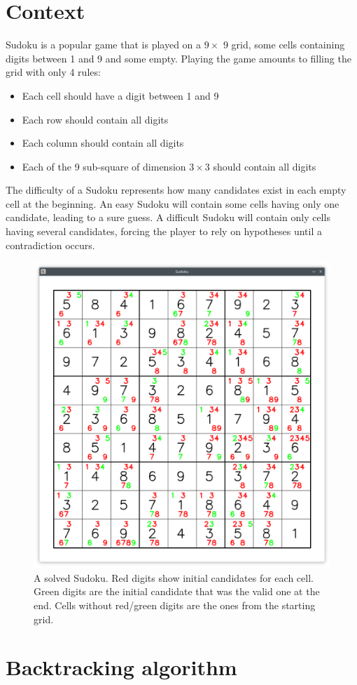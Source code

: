 \documentclass{ecnreport}
\begin{document}

\section{Context}

Sudoku is a popular game that is played on a $9\times$ 9 grid, some cells containing digits between 1 and 9 and some empty.
Playing the game amounts to filling the grid with only 4 rules:
\begin{itemize}
 \item Each cell should have a digit between 1 and 9
 \item Each row should contain all digits
 \item Each column should contain all digits
 \item Each of the 9 sub-square of dimension $3\times 3$ should contain all digits
\end{itemize}

The difficulty of a Sudoku represents how many candidates exist in each empty cell at the beginning. An easy Sudoku will contain some cells having only one candidate, leading to a sure guess. A difficult Sudoku will contain only cells having several candidates, forcing the player to rely on hypotheses until a contradiction occurs.


\begin{figure}[h!]\centering
\includegraphics[width=.5\linewidth]{sudoku.png}
\caption{A solved Sudoku. Red digits show initial candidates for each cell. Green digits are the initial candidate that was the valid one at the end. Cells without red/green digits are the ones from the starting grid.}
\label{fig:trilat}
\end{figure}

\section{Backtracking algorithm}
\end{document}
